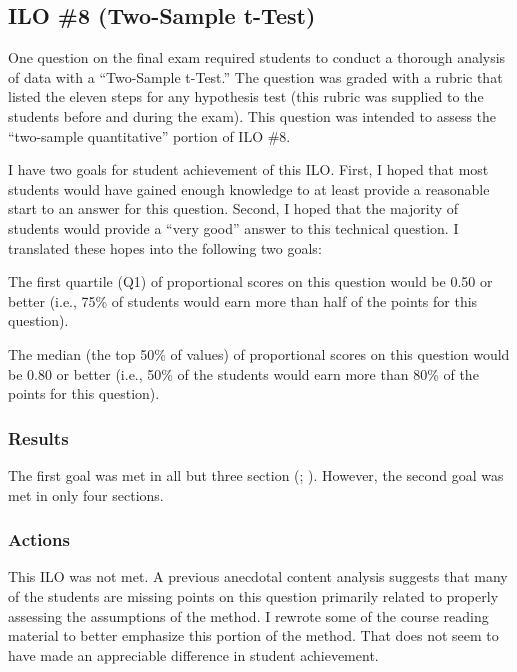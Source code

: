 \documentclass{article}\usepackage[]{graphicx}\usepackage[]{color}
\begin{document}
\clearpage
\subsection{ILO \#8 (Two-Sample t-Test)}
One question on the final exam required students to conduct a thorough analysis of data with a ``Two-Sample t-Test.'' The question was graded with a rubric that listed the eleven steps for any hypothesis test (this rubric was supplied to the students before and during the exam). This question was intended to assess the ``two-sample quantitative'' portion of ILO \#8.

I have two goals for student achievement of this ILO. First, I hoped that most students would have gained enough knowledge to at least provide a reasonable start to an answer for this question. Second, I hoped that the majority of students would provide a ``very good'' answer to this technical question. I translated these hopes into the following two goals:

\begin{Enumerate}
  \item The first quartile (Q1) of proportional scores on this question would be 0.50 or better (i.e., 75\% of students would earn more than half of the points for this question).
  \item The median (the top 50\% of values) of proportional scores on this question would be 0.80 or better (i.e., 50\% of the students would earn more than 80\% of the points for this question).
\end{Enumerate}

\subsubsection{Results}
\vspace{-12pt}


The first goal was met in all but three section (; ). However, the second goal was met in only four sections.

\subsubsection{Actions}
\vspace{-12pt}
This ILO was not met. A previous anecdotal content analysis suggests that many of the students are missing points on this question primarily related to properly assessing the assumptions of the method. I rewrote some of the course reading material to better emphasize this portion of the method. That does not seem to have made an appreciable difference in student achievement.
\vspace{12pt}
\end{document}
